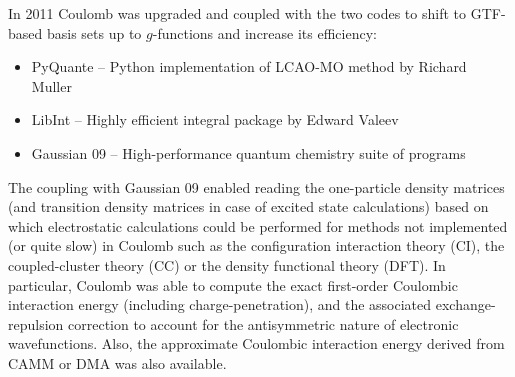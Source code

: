 \documentclass[a4paper,titlepage,twoside,fleqn,12pt]{book}
\begin{document}
\begin{refsection}
In 2011 {\sc Coulomb} was upgraded and coupled with the two codes to shift to GTF\hyp{}based
basis sets up to $g$-functions and increase its efficiency:
%
\begin{itemize}
\item {\sc PyQuante} -- Python implementation of LCAO-MO method by Richard Muller~\citep{Muller.PyQuante.2009}
\item {\sc LibInt} -- Highly efficient integral package by Edward Valeev~\citep{Valeev.LibInt.2013}
\item {\sc Gaussian 09} -- High\hyp{}performance quantum chemistry suite of programs~\citep{Frisch.Gaussian.2009}
\end{itemize}
%
The coupling with {\sc Gaussian 09} enabled reading the one\hyp{}particle 
density matrices (and transition density matrices in case of excited state
calculations) based on which electrostatic calculations could be performed
for methods not implemented (or quite slow) in {\sc Coulomb} such as the 
configuration interaction theory (CI), the
coupled\hyp{}cluster theory (CC) or the density functional theory (DFT).
In particular, {\sc Coulomb} was able to compute the exact first\hyp{}order
Coulombic interaction energy (including charge\hyp{}penetration),
and the associated exchange\hyp{}repulsion correction to account
for the antisymmetric nature of electronic wavefunctions.
Also, the
approximate Coulombic interaction energy derived from CAMM or DMA
was also available.


\end{refsection}
\end{document}
